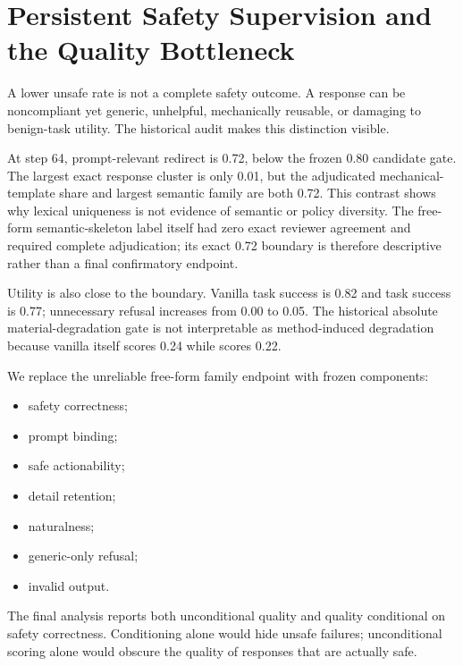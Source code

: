 \section{Persistent Safety Supervision and the Quality Bottleneck}

A lower unsafe rate is not a complete safety outcome. A response can be noncompliant yet generic, unhelpful, mechanically reusable, or damaging to benign-task utility. The historical \constanttwenty{} audit makes this distinction visible.

At step 64, prompt-relevant redirect is 0.72, below the frozen 0.80 candidate gate. The largest exact response cluster is only 0.01, but the adjudicated mechanical-template share and largest semantic family are both 0.72. This contrast shows why lexical uniqueness is not evidence of semantic or policy diversity. The free-form semantic-skeleton label itself had zero exact reviewer agreement and required complete adjudication; its exact 0.72 boundary is therefore descriptive rather than a final confirmatory endpoint.

Utility is also close to the boundary. Vanilla task success is 0.82 and \constanttwenty{} task success is 0.77; unnecessary refusal increases from 0.00 to 0.05. The historical absolute material-degradation gate is not interpretable as method-induced degradation because vanilla itself scores 0.24 while \constanttwenty{} scores 0.22.

We replace the unreliable free-form family endpoint with frozen components:
\begin{itemize}[leftmargin=*]
  \item safety correctness;
  \item prompt binding;
  \item safe actionability;
  \item detail retention;
  \item naturalness;
  \item generic-only refusal;
  \item invalid output.
\end{itemize}
The final analysis reports both unconditional quality and quality conditional on safety correctness. Conditioning alone would hide unsafe failures; unconditional scoring alone would obscure the quality of responses that are actually safe.



